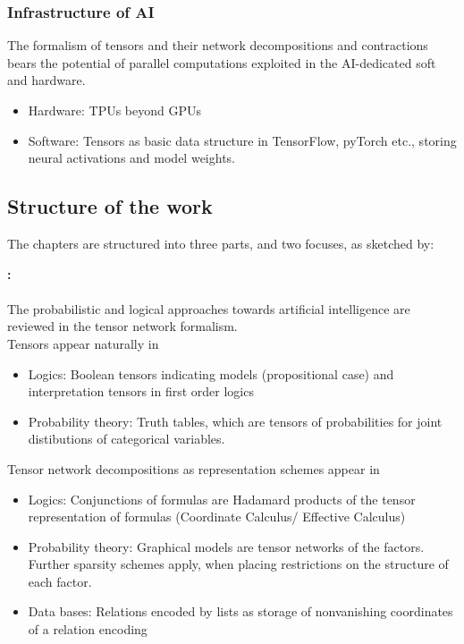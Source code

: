 \subsubsection{Infrastructure of AI}

The formalism of tensors and their network decompositions and contractions bears the potential of parallel computations exploited in the AI-dedicated soft and hardware.
\begin{itemize}
    \item Hardware: TPUs beyond GPUs
    \item Software: Tensors as basic data structure in TensorFlow, pyTorch etc., storing neural activations and model weights.
\end{itemize}



\subsection{Structure of the work}

The chapters are structured into three parts, and two focuses, as sketched by:


\textbf{: \partonetext} \\
\ \\
The probabilistic and logical approaches towards artificial intelligence are reviewed in the tensor network formalism. \\

Tensors appear naturally in
\begin{itemize}
    \item Logics: Boolean tensors indicating models (propositional case) and interpretation tensors in first order logics
    \item Probability theory: Truth tables, which are tensors of probabilities for joint distibutions of categorical variables.
\end{itemize}

Tensor network decompositions as representation schemes appear in
\begin{itemize}
    \item Logics: Conjunctions of formulas are Hadamard products of the tensor representation of formulas (Coordinate Calculus/ Effective Calculus)
    \item Probability theory: Graphical models are tensor networks of the factors. Further sparsity schemes apply, when placing restrictions on the structure of each factor.
    \item Data bases: Relations encoded by lists as storage of nonvanishing coordinates of a relation encoding
\end{itemize}

